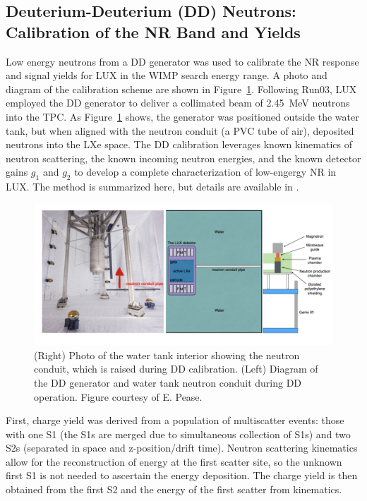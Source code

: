 \subsection{Deuterium-Deuterium (DD) Neutrons: Calibration of the NR Band and Yields}
\label{sec:DD}
Low energy neutrons from a \ac{DD} generator was used to calibrate the \ac{NR} response and signal yields for \ac{LUX} in the \ac{WIMP} search energy range. A photo and diagram of the calibration scheme are shown in Figure~\ref{fig:dd_gen}. Following Run03, \ac{LUX} employed the \ac{DD} generator to deliver a collimated beam of 2.45~MeV neutrons into the \ac{TPC}. As Figure~\ref{fig:dd_gen} shows, the generator was positioned outside the water tank, but when aligned with the neutron conduit (a \ac{PVC} tube of air), deposited neutrons into the \ac{LXe} space. The \ac{DD} calibration leverages known kinematics of neutron scattering, the known incoming neutron energies, and the known detector gains $g_{1}$ and $g_{2}$ to develop a complete characterization of low-engergy \ac{NR} in \ac{LUX}. The method is summarized here, but details are available in \cite{LUXDD}.

\begin{figure}[htbp]
\begin{center}
\includegraphics[width=\textwidth]{figures/lux/lux_ddgenerator.png}
\caption{(Right) Photo of the water tank interior showing the neutron conduit, which is raised during \ac{DD} calibration. (Left) Diagram of the \ac{DD} generator and water tank neutron conduit during \ac{DD} operation. Figure courtesy of E. Pease.}
\label{fig:dd_gen}
\end{center}
\end{figure}

First, charge yield was derived from a population of multiscatter events: those with one S1 (the S1s are merged due to simultaneous collection of S1s) and two S2s (separated in space and z-position/drift time). Neutron scattering kinematics allow for the reconstruction of energy at the first scatter site, so the unknown first S1 is not needed to ascertain the energy deposition. The charge yield is then obtained from the first S2 and the energy of the first scatter from kinematics. 

